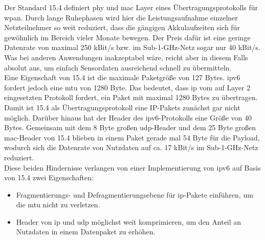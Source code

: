 Der Standard 15.4 definiert \ac{phy} und \ac{mac} Layer eines Übertragungsprotokolls für \ac{wpan}. Durch lange Ruhephasen wird hier die Leistungsaufnahme einzelner Netzteilnehmer so weit reduziert, dass die gängigen Akkulaufzeiten sich für gewöhnlich im Bereich vieler Monate bewegen. Der Preis dafür ist eine geringe Datenrate von maximal 250 \ac{k}Bit/s bzw. im Sub-1-GHz-Netz sogar nur 40 \ac{k}Bit/s. Was bei anderen Anwendungen inakzeptabel wäre, reicht aber in diesem Falls absolut aus, um einfach Sensordaten ausreichend schnell zu übermitteln. \\
Eine Eigenschaft von \ac{15.4} ist die maximale Paketgröße von 127 Bytes. \ac{ipv6} fordert jedoch eine \ac{mtu} von 1280 Byte. Das bedeutet, dass \ac{ip} vom auf Layer 2 eingesetzten Protokoll fordert, ein Paket mit maximal 1280 Bytes zu übertragen. Damit ist \ac{15.4} als Übertragungsprotokoll eine IP-Pakets zunächst gar nicht möglich. Darüber hinaus hat der Header des \ac{ipv6}-Protokolls eine Größe von 40 Bytes. Gemeinsam mit dem 8 Byte großen \ac{udp}-Header und dem 25 Byte großen \ac{mac}-Header von \ac{15.4} blieben in einem Paket gerade mal 54 Byte für die Payload, wodurch sich die Datenrate von Nutzdaten auf ca. 17 \ac{k}Bit/s im Sub-1-GHz-Netz reduziert.\cite{grundlagen6lowpan} \\
Diese beiden Hindernisse verlangen von einer Implementierung von \ac{ipv6} auf Basis von \ac{15.4} zwei Eigenschaften:
\begin{itemize}
	\item Fragmentierungs- und Defragmentierungsebene für \ac{ip}-Pakete einführen, um die \ac{mtu} nicht zu verletzen.
	\item Header von \ac{ip} und \ac{udp} möglichst weit komprimieren, um den Anteil an Nutzdaten in einem Datenpaket zu erhöhen.
\end{itemize}
